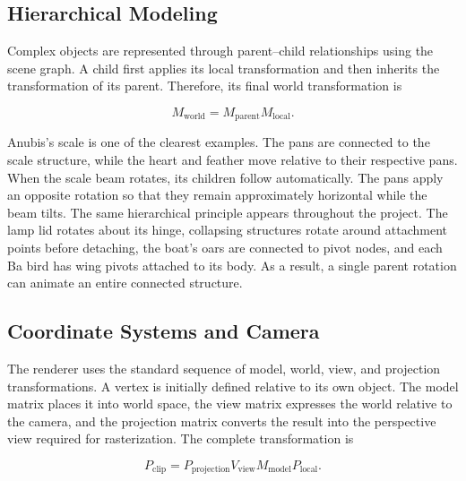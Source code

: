 \documentclass[11pt,a4paper]{article}
\begin{document}

\subsection{Hierarchical Modeling}

Complex objects are represented through parent--child relationships using the
scene graph. A child first applies its local transformation and then inherits
the transformation of its parent. Therefore, its final world transformation is

\begin{equation}
    M_{\mathrm{world}}
    =
    M_{\mathrm{parent}}M_{\mathrm{local}} .
\end{equation}

Anubis's scale is one of the clearest examples. The pans are connected to the
scale structure, while the heart and feather move relative to their respective
pans. When the scale beam rotates, its children follow automatically. The pans
apply an opposite rotation so that they remain approximately horizontal while
the beam tilts. The same hierarchical principle appears throughout the project.
The lamp lid rotates about its hinge, collapsing structures rotate around
attachment points before detaching, the boat's oars are connected to pivot
nodes, and each Ba bird has wing pivots attached to its body. As a result, a
single parent rotation can animate an entire connected structure.


\subsection{Coordinate Systems and Camera}

The renderer uses the standard sequence of model, world, view, and projection
transformations. A vertex is initially defined relative to its own object. The
model matrix places it into world space, the view matrix expresses the world
relative to the camera, and the projection matrix converts the result into the
perspective view required for rasterization. The complete transformation is

\begin{equation}
    P_{\mathrm{clip}}
    =
    P_{\mathrm{projection}}
    V_{\mathrm{view}}
    M_{\mathrm{model}}
    P_{\mathrm{local}} .
\end{equation}
\end{document}
